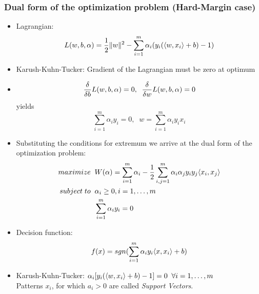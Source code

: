 \subsubsection*{Dual form of the optimization problem (Hard-Margin case)}
\begin{itemize}
    \item
        Lagrangian:
        $$L(w,b,\alpha) = \frac{\displaystyle 1}{\displaystyle 2}\lVert w\rVert^2-\sum_{i=1}^{m}\alpha_i(y_i(\langle w,x_i\rangle+b)-1)$$
    \item
        Karush-Kuhn-Tucker: Gradient of the Lagrangian must be zero at optimum
    \item
        $$\frac{\displaystyle \delta}{\displaystyle \delta b}L(w,b,\alpha) = 0, \;\; \frac{\displaystyle \delta}{\displaystyle \delta w}L(w,b,\alpha) = 0$$
        yields
        $$\sum_{i=1}^{m}\alpha_i y_i = 0, \;\; w = \sum_{i=1}^{m}\alpha_i y_i x_i$$
    \item
        Substituting the conditions for extremum we arrive at the dual form of the optimization problem:
        \begin{align*}
            maximize \; \; & W(\alpha) = \sum_{i=1}^{m}\alpha_i - \ffrac{1}{2}\sum_{i,j=1}^{m}\alpha_i \alpha_j y_i y_j \inner{x_i,x_j}\\
            subject \; to \; \; & \alpha_i \geq 0, i=1,\dots,m \\%
            & \sum_{i=1}^{m} \alpha_i y_i = 0
        \end{align*}
    \item
        Decision function:
        $$f(x) = sgn(\sum_{i=1}^{m}\alpha_i y_i \langle x,x_i\rangle+b)$$
    \item
        Karush-Kuhn-Tucker: $\alpha_i[y_i(\langle w,x_i\rangle+b)-1]=0 \;\;\forall i=1,\dots ,m$\\
        Patterns $x_i$, for which $a_i > 0$ are called \textit{Support Vectors}.
\end{itemize}
